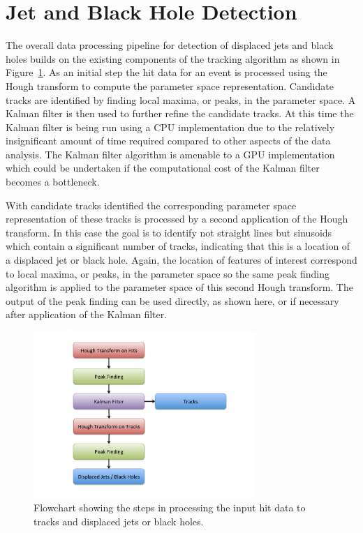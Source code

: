 \documentclass{JINST}
\begin{document}
\section{Jet and Black Hole Detection}

The overall data processing pipeline for detection of displaced jets and black holes builds on the existing components of the tracking algorithm as shown in Figure~\ref{fig:Flowchart}.  As an initial step the hit data for an event is processed using the Hough transform to compute the parameter space representation.  Candidate tracks are identified by finding local maxima, or peaks, in the parameter space.  A Kalman filter is then used to further refine the candidate tracks.  At this time the Kalman filter is being run using a CPU implementation due to the relatively insignificant amount of time required compared to other aspects of the data analysis.  The Kalman filter algorithm is amenable to a GPU implementation which could be undertaken if the computational cost of the Kalman filter becomes a bottleneck.

With candidate tracks identified the corresponding parameter space representation of these tracks is processed by a second application of the Hough transform.  In this case the goal is to identify not straight lines but sinusoids which contain a significant number of tracks, indicating that this is a location of a displaced jet or black hole.  Again, the location of features of interest correspond to local maxima, or peaks, in the parameter space so the same peak finding algorithm is applied to the parameter space of this second Hough transform.  The output of the peak finding can be used directly, as shown here, or if necessary after application of the Kalman filter.

\begin{figure}[!Hhtb]
\begin{center}
\includegraphics[width=0.75\textwidth]{figs/Flowchart.pdf} 
\caption{Flowchart showing the steps in processing the input hit data to tracks and displaced jets or black holes.\label{fig:Flowchart}}
\end{center}
\end{figure}
\end{document}
